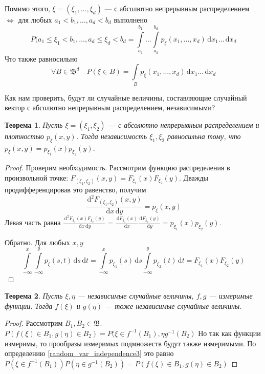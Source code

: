 \documentclass[11pt,openany,a4paper]{scrartcl}
\theoremstyle{plain}
\newtheorem{theorem}{Теорема}[section]
\theoremstyle{definition}
\newcommand{\dif}{\, \mathrm d}
\begin{document}
Помимо этого, $\xi = (\xi_1, \ldots, \xi_d)$ —
с абсолютно непрерывным распределением
$\iff$ для любых $a_1 < b_1, \ldots, a_d < b_d$ выполнено
$$
P(a_1 \leqslant \xi_1 < b_1, \ldots, a_d \leqslant \xi_d < b_d =
\int\limits_{a_1}^{b_1}\ldots\int\limits_{a_d}^{b_d} p_\xi(x_1, \ldots, x_d)
\dif x_1\ldots \dif x_d
$$
Что также равносильно
$$
\forall B \in \mathfrak B^d\quad P(\xi \in B) = \int\limits_B p_\xi(x_1, \ldots, x_d)
\dif x_1\ldots \dif x_d
$$

Как нам проверить, будут ли случайные величины, составляющие случайный вектор
с абсолютно непрерывным распределением, независимыми?

\begin{theorem}
    Пусть $\xi = (\xi_1, \xi_2)$ — с абсолютно непрерывным распределением и 
    плотностью $p_\xi(x, y)$. Тогда независимость $\xi_1, \xi_2$ равносильна
    тому, что $p_\xi(x, y) = p_{\xi_1}(x)p_{\xi_2}(y)$.
\end{theorem}
\begin{proof}
    Проверим необходимость. Рассмотрим функцию распределения в произвольной точке:
    $F_{(\xi_1, \xi_2)}(x, y) = F_{\xi_1}(x)F_{\xi_2}(y)$. Дважды 
    продифференцировав это равенство, получим
    $$
    \frac{\dif^2 F_{(\xi_1, \xi_2)}(x, y)}{\dif x \dif y} = p_\xi(x, y)
    $$
    Левая часть равна $\frac{\dif^2 F_{\xi_1}(x)F_{\xi_2}(y)}{\dif x \dif y} =
    \frac{\dif F_{\xi_1}(x)}{\dif x}\frac{\dif F_{\xi_2}(y)}{\dif y} =
    p_{\xi_1}(x)p_{\xi_2}(y)$.
    
    Обратно. Для любых $x, y$
    $$
    \int\limits_{-\infty}^x\int\limits_{-\infty}^y p_\xi(s, t) \dif s \dif t =
    \int\limits_{-\infty}^x p_{\xi_1}(s) \dif s
    \int\limits_{-\infty}^y p_{\xi_2}(t) \dif t =
    F_{\xi_1}(x)F_{\xi_2}(y)
    $$
\end{proof}

\begin{theorem}\label{functions_of_independent_variables}
    Пусть $\xi, \eta$ — независимые случайные величины, $f, g$ — измеримые 
    функции. Тогда $f(\xi)$ и $g(\eta)$ — тоже независимые случайные величины.
\end{theorem}
\begin{proof}
    Рассмотрим $B_1, B_2 \in \mathfrak B$.
    $P(f(\xi) \in B_1, g(\eta) \in B_2) = P(\xi \in f^{-1}(B_1), \eta g^{-1}(B_2)$
    Но так как функции измеримы, то прообразы измеримых подмножеств будут также 
    измеримыми. По определению \ref{random_var_independence3} это равно
    $P(\xi \in f^{-1}(B_1)) P(\eta \in g^{-1}(B_2)) = P(f(\xi) \in B_1,
    g(\eta) \in B_2)$
\end{proof}
\end{document}
